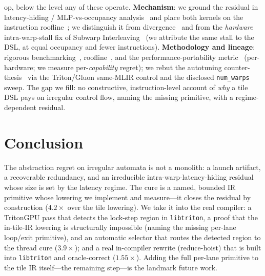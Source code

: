 \documentclass[conference]{IEEEtran}
\begin{document}
op, below the level any of these operate.
\textbf{Mechanism}: we ground the residual in latency-hiding / MLP-vs-occupancy
analysis~\cite{volkov2016latency,hongkim2009} and place both kernels on the instruction
roofline~\cite{instroofline2022}; we distinguish it from divergence~\cite{fung2007} and from the
\emph{hardware} intra-warp-stall fix of Subwarp Interleaving~\cite{subwarp2022} (we attribute the
same stall to the DSL, at equal occupancy and fewer instructions).
\textbf{Methodology and lineage}: rigorous benchmarking~\cite{hoefler2015}, roofline~\cite{roofline2009},
and the performance-portability metric~\cite{pennycook2016} (per-hardware; we measure per-\emph{capability}
regret); we rebut the autotuning counter-thesis~\cite{ringlein2025} via the Triton/Gluon same-MLIR
control and the disclosed \texttt{num\_warps} sweep. The gap we fill: no constructive,
instruction-level account of \emph{why} a tile DSL pays on irregular control flow, naming the missing
primitive, with a regime-dependent residual.

\section{Conclusion}
The abstraction regret on irregular automata is not a monolith: a launch artifact, a recoverable
redundancy, and an irreducible intra-warp-latency-hiding residual whose size is set by the latency
regime. The cure is a named, bounded IR primitive whose lowering we implement and measure---it closes
the residual by construction ($4.2\times$ over the tile lowering). We take it into the real compiler: a
TritonGPU pass that detects the lock-step region in \texttt{libtriton}, a proof that the in-tile-IR
lowering is structurally impossible (naming the missing per-lane loop/exit primitive), and an automatic
selector that routes the detected region to the thread cure ($3.9\times$); and a real in-compiler
rewrite (reduce-hoist) that is built into \texttt{libtriton} and oracle-correct ($1.55\times$). Adding the
full per-lane primitive to the tile IR itself---the remaining step---is the landmark future work.
\end{document}
